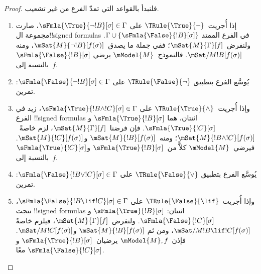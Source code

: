 \documentclass[../../../include/open-logic-section]{subfiles}
\begin{document}
\begin{proof}
فلنبدأ بالقواعد التي تمدّ الفرع من غير تشعيب.
\begin{enumerate}
\item إذا أُجريت~$\TRule{\True}{\lnot}$ على
  $\sFmla{\True}{\lnot !B}[\sigma] \in \Gamma$،
  صارت مجموعة ال!!{signed formula}s في الفرع الممتد
  $\Gamma \cup
  \{\sFmla{\False}{!B}[\sigma]\}$. ولنفرض~$\mSat{M}{\Gamma}[f]$؛
  ففي جملة ما يصدق~$\mSat{M}{\lnot !B}[f(\sigma)]$، ومنه
  $\mSat/{M}{!B}[f(\sigma)]$. فالنموذج~$\mModel{M}$ يرضي
  $\sFmla{\False}{!B}[\sigma]$ بالنسبة إلى~$f$.
\item يُوسَّع الفرع بتطبيق $\TRule{\False}{\lnot}$ على
  $\sFmla{\False}{\lnot !B}[\sigma] \in \Gamma$: تمرين.
\item وإذا أُجريت~$\TRule{\True}{\land}$ على
  $\sFmla{\True}{!B \land !C}[\sigma] \in \Gamma$،
  زيد في الفرع !!{signed formula}s اثنتان، هما
  $\sFmla{\True}{!B}[\sigma]$ و$\sFmla{\True}{!C}[\sigma]$.
  فإن فرضنا~$\mSat{M}{\Gamma}[f]$، لزم خاصةً~$\mSat{M}{!B \land
    !C}[f(\sigma)]$؛ ومنه~$\mSat{M}{!B}[f(\sigma)]$
  و$\mSat{M}{!C}[f(\sigma)]$. فيرضي~$\mModel{M}$
  كلاًّ من~$\sFmla{\True}{!B}[\sigma]$
  و$\sFmla{\True}{!C}[\sigma]$ بالنسبة إلى~$f$.
\item يُوسَّع الفرع بتطبيق $\TRule{\False}{\lor}$ على
  $\sFmla{\False}{!B \lor !C}[\sigma] \in \Gamma$: تمرين.
\item وإذا أُجريت~$\TRule{\False}{\lif}$ على
  $\sFmla{\False}{!B \lif !C}[\sigma] \in \Gamma$،
  نتجت !!{signed formula}s اثنتان:
  $\sFmla{\True}{!B}[\sigma]$ و$\sFmla{\False}{!C}[\sigma]$.
  ولنفرض~$\mSat{M}{\Gamma}[f]$، فيلزم خاصةً
  $\mSat/{M}{!B \lif !C}[f(\sigma)]$، ومن ثم
  $\mSat{M}{!B}[f(\sigma)]$ و$\mSat/{M}{!C}[f(\sigma)]$.
  فإذن~$\mModel{M}, f$ يرضيان~$\sFmla{\True}{!B}[\sigma]$
  و$\sFmla{\False}{!C}[\sigma]$ معًا.

\end{enumerate}
\end{proof}
\end{document}
